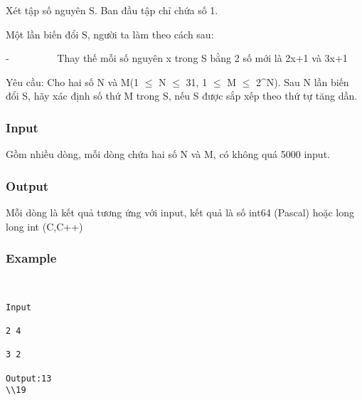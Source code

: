



   Xét tập số nguyên S. Ban đầu tập chỉ chứa số 1.  

   Một lần biến đổi S, người ta làm theo cách sau:  

   -          Thay thế mỗi số nguyên x trong S bằng 2 số mới là 2x+1 và 3x+1  

   Yêu cầu: Cho hai số N và M(1 $\le$ N $\le$ 31, 1 $\le$ M $\le$ 2^N). Sau N lần biến đổi S, hãy xác định số thứ M trong S, nếu S được sắp xếp theo thứ tự tăng dần.  

\subsubsection{   Input  }

   Gồm nhiều dòng, mỗi dòng chứa hai số N và M, có không quá 5000 input.  

\subsubsection{   Output  }

   Mỗi dòng là kết quả tương ứng với input, kết quả là số int64 (Pascal) hoặc long long int (C,C++)  

\subsubsection{   Example  }
\begin{verbatim}


Input

2 4

3 2

Output:13
\\19\end{verbatim}
